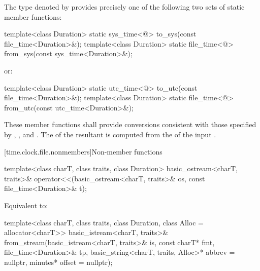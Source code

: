 %
\pnum
The type denoted by  provides
precisely one of the following two sets of static member functions:
\begin{codeblock}
template<class Duration>
  static sys_time<@\seebelow@>
    to_sys(const file_time<Duration>&);
template<class Duration>
  static file_time<@\seebelow@>
    from_sys(const sys_time<Duration>&);
\end{codeblock}
or:
\begin{codeblock}
template<class Duration>
  static utc_time<@\seebelow@>
    to_utc(const file_time<Duration>&);
template<class Duration>
  static file_time<@\seebelow@>
    from_utc(const utc_time<Duration>&);
\end{codeblock}

These member functions shall provide  conversions
consistent with those specified by
, , and .
The  of the resultant 
is computed from the  of the input .

[time.clock.file.nonmembers]{Non-member functions}

%
\begin{itemdecl}
template<class charT, class traits, class Duration>
  basic_ostream<charT, traits>&
    operator<<(basic_ostream<charT, traits>& os, const file_time<Duration>& t);
\end{itemdecl}

\begin{itemdescr}
\pnum
\effects
Equivalent to:
\end{itemdescr}

%
\begin{itemdecl}
template<class charT, class traits, class Duration, class Alloc = allocator<charT>>
  basic_istream<charT, traits>&
    from_stream(basic_istream<charT, traits>& is, const charT* fmt,
                file_time<Duration>& tp, basic_string<charT, traits, Alloc>* abbrev = nullptr,
                minutes* offset = nullptr);
\end{itemdecl}

